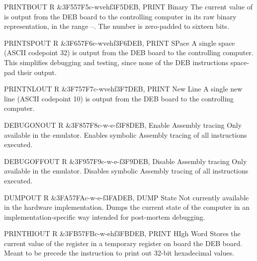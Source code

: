\begin{extcmd}{PRINTB}{OUT R \&3F5}{57F5}{c-wvehf}{3F5}{DEB, PRINT Binary}
  The current value of \A{} is output from the \gls{DEB} board to the
  controlling computer in its raw binary representation, in the range
  –. The number is
  zero-padded to sixteen bits.
\end{extcmd}

\begin{extcmd}{PRINTSP}{OUT R \&3F6}{57F6}{c-wvehf}{3F6}{DEB, PRINT SPace}
  A single space (ASCII codepoint 32) is output from the \gls{DEB} board
  to the controlling computer. This simplifies debugging and testing,
  since none of the \gls{DEB} instructions space-pad their output.
\end{extcmd}

\begin{extcmd}{PRINTNL}{OUT R \&3F7}{57F7}{c-wvehf}{3F7}{DEB, PRINT New Line}
  A single new line (ASCII codepoint 10) is output from the \gls{DEB} board
  to the controlling computer.
\end{extcmd}

\begin{extcmd}{DEBUGON}{OUT R \&3F8}{57F8}{c-w-e-f}{3F8}{DEB, Enable Assembly tracing}
  Only available in the emulator. Enables symbolic \gls{Assembly} tracing of all
  instructions executed.
\end{extcmd}

\begin{extcmd}{DEBUGOFF}{OUT R \&3F9}{57F9}{c-w-e-f}{3F9}{DEB, Disable Assembly tracing}
  Only available in the emulator. Disables symbolic \gls{Assembly} tracing of all
  instructions executed.
\end{extcmd}

\begin{extcmd}{DUMP}{OUT R \&3FA}{57FA}{c-w-e-f}{3FA}{DEB, DUMP State}
  Not currently available in the hardware implementation. Dumps the
  current state of the computer in an implementation-specific way
  intended for post-mortem debugging.
\end{extcmd}

\begin{extcmd}{PRINTHI}{OUT R \&3FB}{57FB}{c-w-ehf}{3FB}{DEB, PRINT HIgh Word}
  Stores the current value of the \A{} register in a temporary register
  on board the \gls{DEB} board. Meant to be precede the
   instruction to print out 32-bit hexadecimal values.
\end{extcmd}

